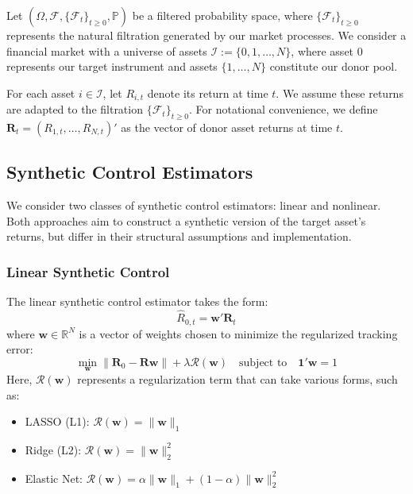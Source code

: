 Let $(\Omega, \mathcal{F}, \{\mathcal{F}_t\}_{t\geq 0}, \mathbb{P})$ be a filtered probability space, where $\{\mathcal{F}_t\}_{t\geq 0}$ represents the natural filtration generated by our market processes. We consider a financial market with a universe of assets $\mathcal{I} := \{0,1,\ldots,N\}$, where asset 0 represents our target instrument and assets $\{1,\ldots,N\}$ constitute our donor pool.

For each asset $i \in \mathcal{I}$, let $R_{i,t}$ denote its return at time $t$. We assume these returns are adapted to the filtration $\{\mathcal{F}_t\}_{t\geq 0}$. For notational convenience, we define $\mathbf{R}_t = (R_{1,t},\ldots,R_{N,t})'$ as the vector of donor asset returns at time $t$.

\subsection{Synthetic Control Estimators}

We consider two classes of synthetic control estimators: linear and nonlinear. Both approaches aim to construct a synthetic version of the target asset's returns, but differ in their structural assumptions and implementation.

\subsubsection{Linear Synthetic Control}

The linear synthetic control estimator takes the form:
\begin{equation}
    \hat{R}_{0,t} = \mathbf{w}'\mathbf{R}_t
\end{equation}
where $\mathbf{w} \in \mathbb{R}^N$ is a vector of weights chosen to minimize the regularized tracking error:
\begin{equation}
    \min_{\mathbf{w}} \|\mathbf{R}_0 - \mathbf{R}\mathbf{w}\| + \lambda\mathcal{R}(\mathbf{w}) 
    \quad \text{subject to} \quad \mathbf{1}'\mathbf{w} = 1
\end{equation}
Here, $\mathcal{R}(\mathbf{w})$ represents a regularization term that can take various forms, such as:
\begin{itemize}
    \item LASSO (L1): $\mathcal{R}(\mathbf{w}) = \|\mathbf{w}\|_1$
    \item Ridge (L2): $\mathcal{R}(\mathbf{w}) = \|\mathbf{w}\|_2^2$
    \item Elastic Net: $\mathcal{R}(\mathbf{w}) = \alpha\|\mathbf{w}\|_1 + (1-\alpha)\|\mathbf{w}\|_2^2$
\end{itemize}

